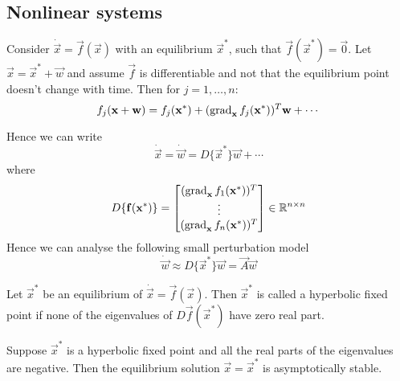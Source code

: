 \subsection{Nonlinear systems}
Consider $\dot{\vec x} = \vec f(\vec x)$ with an equilibrium $\vec x^\ast$, such that $\vec f(\vec x^\ast) = \vec 0$. Let $\vec x = \vec x^\ast + \vec w$ and assume $\vec f$ is differentiable and not that the equilibrium point doesn't change with time. Then for $j = 1, \dotsc, n$:
\begin{equation*}
	f_j(\boldsymbol{\mathbf{x}} + \boldsymbol{\mathbf{w}}) = f_j(\boldsymbol{\mathbf{x}}^\ast) + (\operatorname{grad}_{\boldsymbol{\mathbf{x}}} f_j(\boldsymbol{\mathbf{x}}^\ast))^T \boldsymbol{\mathbf{w}} + \cdots
\end{equation*}

Hence we can write
\begin{equation*}
	\dot{\vec x} = \dot{\vec w} = D\{\vec x^\ast\} \vec w + \cdots
\end{equation*}
where
\begin{equation*}
	D\{\boldsymbol{\mathbf{f}}(\boldsymbol{\mathbf{x}}^\ast)\} =
		\begin{bmatrix}
			(\operatorname{grad}_{\boldsymbol{\mathbf{x}}} f_1(\boldsymbol{\mathbf{x}}^\ast))^T \\
			\vdots \\
			(\operatorname{grad}_{\boldsymbol{\mathbf{x}}} f_n(\boldsymbol{\mathbf{x}}^\ast))^T \\
		\end{bmatrix} \in \mathbb R^{n \times n}
\end{equation*}
Hence we can analyse the following small perturbation model
\begin{equation*}
	\dot{\vec w} \approx D\{\vec x^\ast\} \vec w = \vec A \vec w
\end{equation*}

\begin{definition}
	Let $\vec x^\ast$ be an equilibrium of $\dot{\vec x} = \vec f(\vec x)$. Then $\vec x^\ast$ is called a hyperbolic fixed point if none of the eigenvalues of $D\vec f(\vec x^\ast)$ have zero real part.
\end{definition}

\begin{theorem}
	Suppose $\vec x^\ast$ is a hyperbolic fixed point and all the real parts of the eigenvalues are negative. Then the equilibrium solution $\vec x = \vec x^\ast$ is asymptotically stable.
\end{theorem}